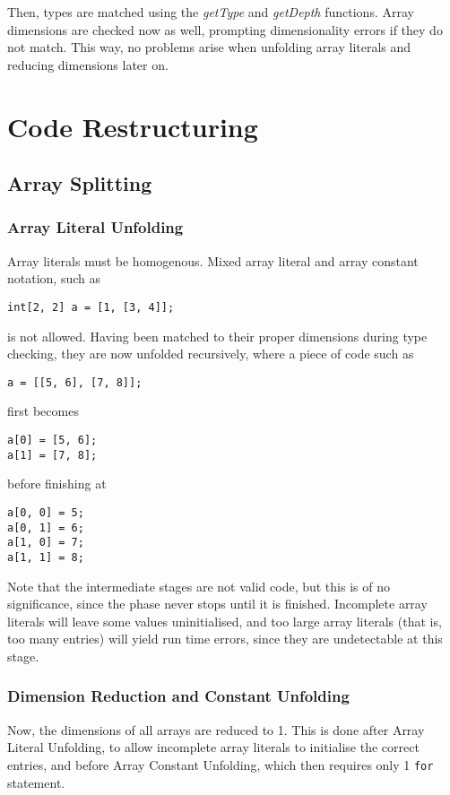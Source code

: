 \documentclass[a4paper,11pt]{report}
\begin{document}
Then, types are matched using the \emph{getType} and \emph{getDepth} functions. Array dimensions are checked now as well, prompting dimensionality errors if they do not match. This way, no problems arise when unfolding array literals and reducing dimensions later on.

\section{Code Restructuring}

\subsection{Array Splitting}
\subsubsection{Array Literal Unfolding}
Array literals must be homogenous. Mixed array literal and array constant notation, such as
\begin{verbatim}
int[2, 2] a = [1, [3, 4]];
\end{verbatim}
is not allowed. Having been matched to their proper dimensions during type checking, they are now unfolded recursively, where a piece of code such as
\begin{verbatim}
a = [[5, 6], [7, 8]];
\end{verbatim}
first becomes
\begin{verbatim}
a[0] = [5, 6];
a[1] = [7, 8];
\end{verbatim}
before finishing at
\begin{verbatim}
a[0, 0] = 5;
a[0, 1] = 6;
a[1, 0] = 7;
a[1, 1] = 8;
\end{verbatim}
Note that the intermediate stages are not valid code, but this is of no significance, since the phase never stops until it is finished. Incomplete array literals will leave some values uninitialised, and too large array literals (that is, too many entries) will yield run time errors, since they are undetectable at this stage.

\subsubsection{Dimension Reduction and Constant Unfolding}
Now, the dimensions of all arrays are reduced to 1. This is done after Array Literal Unfolding, to allow incomplete array literals to initialise the correct entries, and before Array Constant Unfolding, which then requires only 1 \texttt{for} statement. 
\end{document}

